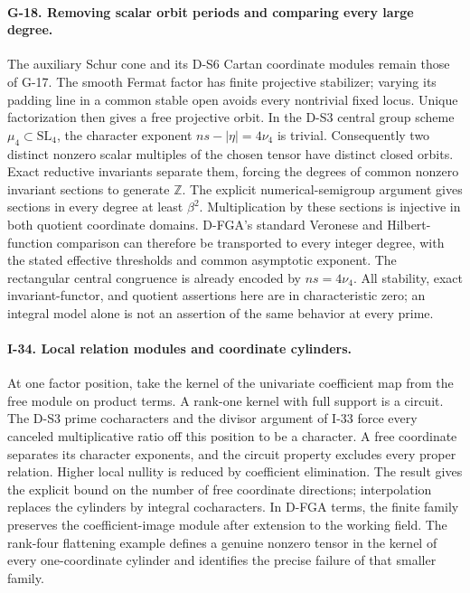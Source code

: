 \paragraph{G-18. Removing scalar orbit periods and comparing every large degree.}
The auxiliary Schur cone and its D-S6 Cartan coordinate modules remain
those of G-17. The smooth Fermat factor has finite projective stabilizer;
varying its padding line in a common stable open avoids every nontrivial
fixed locus. Unique factorization then gives a free projective orbit.
In the D-S3 central group scheme $\mu_4\subset\mathrm{SL}_4$, the
character exponent $ns-|\eta|=4\nu_4$ is trivial. Consequently two
distinct nonzero scalar multiples of the chosen tensor have distinct
closed orbits. Exact reductive invariants separate them, forcing the
degrees of common nonzero invariant sections to generate $\mathbb Z$.
The explicit numerical-semigroup argument gives sections in every
degree at least $\beta^2$. Multiplication by these sections is injective
in both quotient coordinate domains. D-FGA's standard Veronese and
Hilbert-function comparison can therefore be transported to every
integer degree, with the stated effective thresholds and common
asymptotic exponent. The rectangular central congruence is already
encoded by $ns=4\nu_4$. All stability, exact invariant-functor, and
quotient assertions here are in characteristic zero; an integral
model alone is not an assertion of the same behavior at every prime.

\paragraph{I-34. Local relation modules and coordinate cylinders.}
At one factor position, take the kernel of the univariate coefficient
map from the free module on product terms. A rank-one kernel with full
support is a circuit. The D-S3 prime cocharacters and the divisor
argument of I-33 force every canceled multiplicative ratio off this
position to be a character. A free coordinate separates its character
exponents, and the circuit property excludes every proper relation.
Higher local nullity is reduced by coefficient elimination. The result
gives the explicit bound on the number of free coordinate directions;
interpolation replaces the cylinders by integral cocharacters. In
D-FGA terms, the finite family preserves the coefficient-image module
after extension to the working field. The rank-four flattening example
defines a genuine nonzero tensor in the kernel of every one-coordinate
cylinder and identifies the precise failure of that smaller family.

